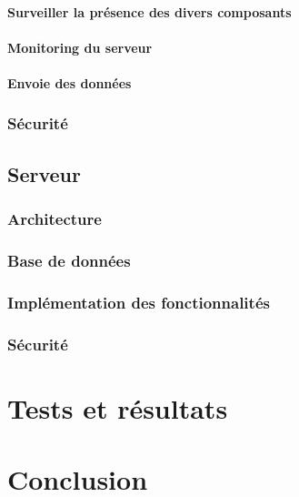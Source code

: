\subsubsection{Surveiller la présence des divers composants}

\subsubsection{Monitoring du serveur}

\subsubsection{Envoie des données}



\subsection{Sécurité}
\newpage
\section{Serveur}

\subsection{Architecture}
\subsection{Base de données}
\subsection{Implémentation des fonctionnalités}
\subsection{Sécurité}

\chapter{Tests et résultats}


\chapter{Conclusion}
